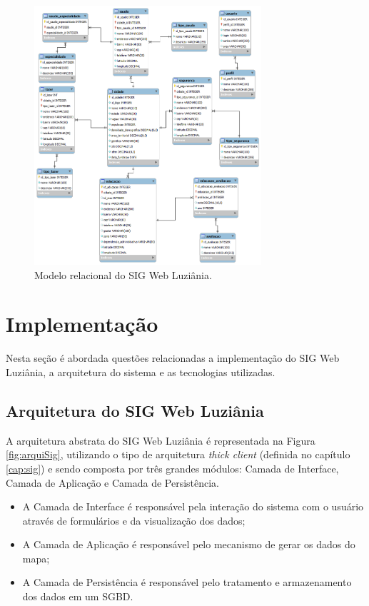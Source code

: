 \begin{figure}[h!]
\centering
\includegraphics[width=0.75\textwidth]{./img/cap_IV/2-ModeloER}
\caption{Modelo relacional do SIG Web Luziânia.}
\label{fig:ModeloER}
\end{figure}

\section{Implementação}

Nesta seção é abordada questões relacionadas a implementação do SIG Web Luziânia, a arquitetura do sistema e as tecnologias utilizadas.

\subsection{Arquitetura do SIG Web Luziânia}

A arquitetura abstrata do SIG Web Luziânia é representada na Figura \ref{fig:arquiSig}, utilizando o tipo de arquitetura \textit{thick client} (definida no capítulo \ref{cap:sig}) e sendo composta por três grandes módulos: Camada de Interface, Camada de Aplicação e Camada de Persistência.

\begin{itemize}
\item A Camada de Interface é responsável pela interação do sistema com o usuário através de formulários e da visualização dos dados;
\item A Camada de Aplicação é responsável pelo mecanismo de gerar os dados do mapa;
\item A Camada de Persistência é responsável pelo tratamento e armazenamento dos dados em um SGBD.
\end{itemize}

